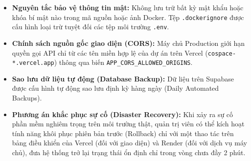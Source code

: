 \begin{itemize}
    \item \textbf{Nguyên tắc bảo vệ thông tin mật:} Không lưu trữ bất kỳ mật khẩu hoặc khóa bí mật nào trong mã nguồn hoặc ảnh Docker. Tệp \texttt{.dockerignore} được cấu hình loại trừ tuyệt đối các tệp môi trường \texttt{.env}.
    \item \textbf{Chính sách nguồn gốc giao diện (CORS):} Máy chủ Production giới hạn quyền gọi API chỉ từ các tên miền hợp lệ của dự án trên Vercel (\texttt{cospace-*.vercel.app}) thông qua biến \texttt{APP\_CORS\_ALLOWED\_ORIGINS}.
    \item \textbf{Sao lưu dữ liệu tự động (Database Backup):} Dữ liệu trên Supabase được cấu hình tự động sao lưu định kỳ hàng ngày (Daily Automated Backups).
    \item \textbf{Phương án khắc phục sự cố (Disaster Recovery):} Khi xảy ra sự cố phần mềm nghiêm trọng trên môi trường thật, quản trị viên có thể kích hoạt tính năng khôi phục phiên bản trước (Rollback) chỉ với một thao tác trên bảng điều khiển của Vercel (đối với giao diện) và Render (đối với dịch vụ máy chủ), đưa hệ thống trở lại trạng thái ổn định chỉ trong vòng chưa đầy 2 phút.
\end{itemize}
